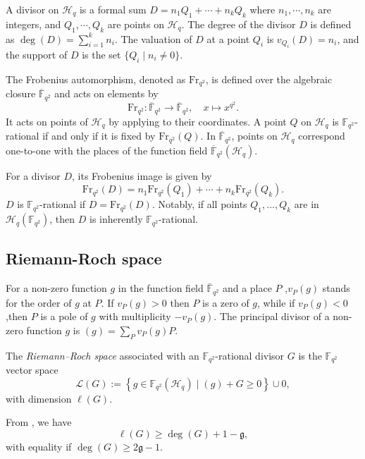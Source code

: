 \documentclass[a4paper]{amsart}
\theoremstyle{plain}
\theoremstyle{definition}
\theoremstyle{remark}
\newcommand{\set}[1]{\left\{#1\right\}}
\begin{document}
A divisor on $\mathscr{H}_q$ is a formal sum $D = n_1 Q_1 + \cdots + n_k Q_k$ where $n_1, \cdots, n_k$ are integers, and $Q_1, \cdots, Q_k$ are points on $\mathscr{H}_q$. The degree of the divisor $D$ is defined as $\deg(D) = \sum_{i=1}^k n_i$. The valuation of $D$ at a point $Q_i$ is $v_{Q_i}(D) = n_i$, and the support of $D$ is the set $\{ Q_i \mid n_i \neq 0 \}$.

The Frobenius automorphism, denoted as $\text{Fr}_{q^2}$, is defined over the algebraic closure $\overline{\mathbb{F}}_{q^2}$ and acts on elements by
\[
	\text{Fr}_{q^2}: \overline{\mathbb{F}}_{q^2} \to \overline{\mathbb{F}}_{q^2}, \quad x \mapsto x^{q^2}.
\]
It acts on points of $\mathscr{H}_q$ by applying to their coordinates. A point $Q$ on $\mathscr{H}_q$ is $\mathbb{F}_{q^2}$-rational if and only if it is fixed by $\text{Fr}_{q^2}(Q)$. In $\overline{\mathbb{F}}_{q^2}$, points on $\mathscr{H}_q$ correspond one-to-one with the places of the function field $\overline{\mathbb{F}}_{q^2}(\mathscr{H}_q)$.

For a divisor $D$, its Frobenius image is given by
\[
	\text{Fr}_{q^2}(D) = n_1 \text{Fr}_{q^2}(Q_1) + \cdots + n_k \text{Fr}_{q^2}(Q_k).
\]
$D$ is $\mathbb{F}_{q^2}$-rational if $D = \text{Fr}_{q^2}(D)$. Notably, if all points $Q_1, \ldots, Q_k$ are in $\mathscr{H}_q(\mathbb{F}_{q^2})$, then $D$ is inherently $\mathbb{F}_{q^2}$-rational.

\subsection*{Riemann-Roch space}

For a non-zero function $g$ in the function field $\bar{\mathbb{F}}_{q^2}$ and a place $P$ ,$v_P(g)$ stands for the order of $g$ at $P$. If $v_P(g) > 0$ then $P$ is a zero of $g$, while if $v_P(g) < 0 $,then $P$ is a pole of $g$ with multiplicity  $-v_P(g)$. The principal divisor of a non-zero function $g$ is $(g)= \sum_{P}v_P(g) P$.

The \emph{Riemann--Roch space} associated with an  $\mathbb{F}_{q^2}$-rational divisor $G$ is the $\mathbb{F}_{q^2}$ vector space \[\mathscr{L}(G) := \set{g \in \mathbb{F}_{q^2}(\mathscr{H}_q) \mid (g) + G \geq 0} \cup {0},\] with dimension $\ell(G)$.


From  \cite[Riemann's Theorem~1.4.17]{stichtenoth2009algebraic}, we have \[\ell(G) \geq \deg(G) +1 - \mathfrak{g},\] with equality if $\deg(G) \geq 2\mathfrak{g}-1$.
\end{document}

